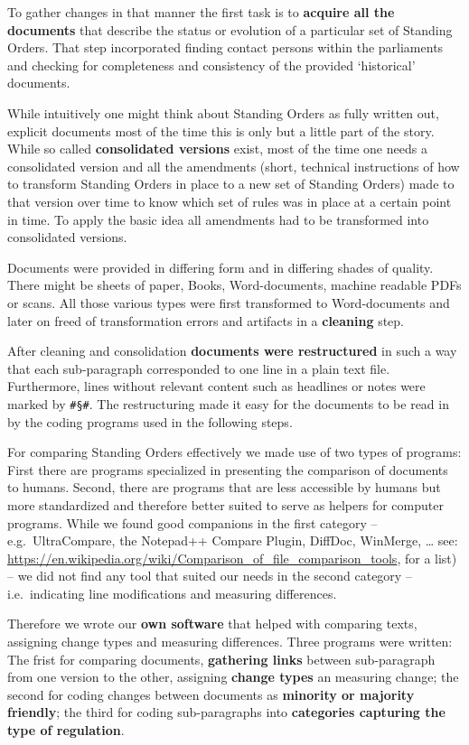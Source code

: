 \documentclass[10pt,]{article}
\begin{document}
To gather changes in that manner the first task is to \textbf{acquire
all the documents} that describe the status or evolution of a particular
set of Standing Orders. That step incorporated finding contact persons
within the parliaments and checking for completeness and consistency of
the provided `historical' documents.

While intuitively one might think about Standing Orders as fully written
out, explicit documents most of the time this is only but a little part
of the story. While so called \textbf{consolidated versions} exist, most
of the time one needs a consolidated version and all the amendments
(short, technical instructions of how to transform Standing Orders in
place to a new set of Standing Orders) made to that version over time to
know which set of rules was in place at a certain point in time. To
apply the basic idea all amendments had to be transformed into
consolidated versions.

Documents were provided in differing form and in differing shades of
quality. There might be sheets of paper, Books, Word-documents, machine
readable PDFs or scans. All those various types were first transformed
to Word-documents and later on freed of transformation errors and
artifacts in a \textbf{cleaning} step.

After cleaning and consolidation \textbf{documents were restructured} in
such a way that each sub-paragraph corresponded to one line in a plain
text file. Furthermore, lines without relevant content such as headlines
or notes were marked by \texttt{\#§\#}. The restructuring made it easy
for the documents to be read in by the coding programs used in the
following steps.

For comparing Standing Orders effectively we made use of two types of
programs: First there are programs specialized in presenting the
comparison of documents to humans. Second, there are programs that are
less accessible by humans but more standardized and therefore better
suited to serve as helpers for computer programs. While we found good
companions in the first category -- e.g.~UltraCompare, the Notepad++
Compare Plugin, DiffDoc, WinMerge, \ldots{} see:
\url{https://en.wikipedia.org/wiki/Comparison_of_file_comparison_tools},
for a list) -- we did not find any tool that suited our needs in the
second category -- i.e.~indicating line modifications and measuring
differences.

Therefore we wrote our \textbf{own software} that helped with comparing
texts, assigning change types and measuring differences. Three programs
were written: The frist for comparing documents, \textbf{gathering
links} between sub-paragraph from one version to the other, assigning
\textbf{change types} an measuring change; the second for coding changes
between documents as \textbf{minority or majority friendly}; the third
for coding sub-paragraphs into \textbf{categories capturing the type of
regulation}.
\end{document}
